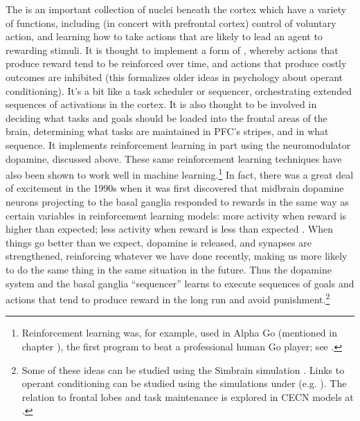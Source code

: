  The  is an important collection of nuclei beneath the cortex which have a variety of functions, including (in concert with prefrontal cortex) control of voluntary action, and learning how to take actions that are likely to lead an agent to rewarding stimuli. It is thought to implement a form of , whereby actions that produce reward tend to be reinforced over time, and actions that produce costly outcomes are inhibited (this formalizes older ideas in psychology about operant conditioning). It's a bit like a task scheduler or sequencer, orchestrating extended sequences of activations in the cortex. It is also thought to be involved in deciding what tasks and goals should be loaded into the frontal areas of the brain, determining what tasks are maintained in PFC's stripes, and in what sequence. It implements reinforcement learning in part using the neuromodulator dopamine, discussed above. These same reinforcement learning techniques have also been shown to work well in machine learning.\footnote{Reinforcement learning was, for example, used in Alpha Go (mentioned in chapter ), the first program to beat a professional human Go player; see .} In fact, there was a great deal of excitement in the 1990s when it was first discovered that midbrain dopamine neurons projecting to the basal ganglia responded to rewards in the same way as certain variables in reinforcement learning models: more activity when reward is higher than expected; less activity when reward is less than expected  \cite{schultz1997neural, niv2009reinforcement}. When things go better than we expect, dopamine is released, and synapses are strengthened, reinforcing whatever we have done recently, making us more likely to do the same thing in the same situation in the future. Thus the dopamine system and the basal ganglia ``sequencer'' learns to execute sequences of goals and actions that tend to produce reward in the long run and avoid punishment.\footnote{Some of these ideas can be studied using the Simbrain simulation . Links to operant conditioning can be studied using the simulations under  (e.g. ). The relation to frontal lobes and task maintenance is explored in CECN models at .}
 
